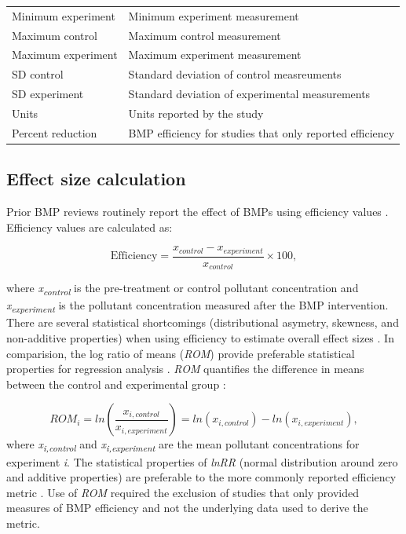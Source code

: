 \documentclass[utf8]{FrontiersinHarvard}
\begin{document}
\begin{table}
\begin{tabular}[t]{>{\raggedright\arraybackslash}p{10em}>{\raggedright\arraybackslash}p{25em}}
Minimum experiment & Minimum experiment measurement\\
Maximum control & Maximum control measurement\\
Maximum experiment & Maximum experiment measurement\\
\addlinespace
SD control & Standard deviation of control measreuments\\
SD experiment & Standard deviation of experimental measurements\\
Units & Units reported by the study\\
Percent reduction & BMP efficiency for studies that only reported efficiency\\
\bottomrule
\end{tabular}
\end{table}

\hypertarget{effect-size-calculation}{%
\subsection*{Effect size calculation}\label{effect-size-calculation}}

Prior BMP reviews routinely report the effect of BMPs using efficiency
values
\citep[see][]{agouridisLivestockGrazingManagement2005, krogerReviewBestManagement2012, liuEnhancingRainfallrunoffModel2015, simpsonDevelopingBestManagement2009}.
Efficiency values are calculated as:

\[
\text{Efficiency}=\frac{x_{control}-x_{experiment}}{x_{control}}\times 100,
\]

where \emph{x\textsubscript{control}} is the pre-treatment or control
pollutant concentration and \emph{x\textsubscript{experiment}} is the
pollutant concentration measured after the BMP intervention. There are
several statistical shortcomings (distributional asymetry, skewness, and
non-additive properties) when using efficiency to estimate overall
effect sizes
\citep{nuzzoPercentDifferencesAnother2018, coleStatisticsNotesWhat2017}.
In comparision, the log ratio of means (\emph{ROM}) provide preferable
statistical properties for regression analysis
\citep{osenbergEffectSizeEcological1997, hedgesMetaanalysisResponseRatios1999}.
\emph{ROM} quantifies the difference in means between the control and
experimental group \citep{hedgesMetaanalysisResponseRatios1999}:

\[
ROM_i = ln\left(\frac{x_{i,control}}{x_{i,experiment}}\right) = ln(x_{i, control})-ln(x_{i, experiment}),
\] where \emph{x\textsubscript{i,control}} and
\emph{x\textsubscript{i,experiment}} are the mean pollutant
concentrations for experiment \emph{i}. The statistical properties of
\emph{lnRR} (normal distribution around zero and additive properties)
are preferable to the more commonly reported efficiency metric
\citep{osenbergEffectSizeEcological1997, hedgesMetaanalysisResponseRatios1999}.
Use of \emph{ROM} required the exclusion of studies that only provided
measures of BMP efficiency and not the underlying data used to derive
the metric.
\end{document}
